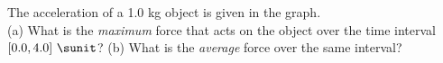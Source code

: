 The acceleration of a 1.0 kg object is given in the graph.\\
%
(a) What is the \emph{maximum} force that acts on the object over the time
interval $[0.0,4.0]\ \sunit$?\answercheck\hwendpart
%
(b) What is the \emph{average} force over the same interval?\answercheck
